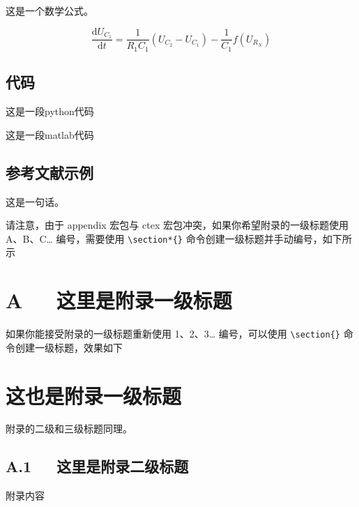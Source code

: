 \documentclass{MPEtemplate}
\begin{document}
这是一个数学公式。

\begin{equation}
    \frac{\mathrm{d} U_{C_1}}{\mathrm{d}  t}=\frac{1}{R_1 C_1} \left(U_{C_2}-U_{C_1}\right)-\frac{1}{C_1} f\left(U_{R_N}\right)
\end{equation}

\subsection{代码}

这是一段python代码



这是一段matlab代码



\subsection{参考文献示例}

这是一句话\cite{edwards1975theory}。

\printbibliography
\beginAppendix
请注意，由于 appendix 宏包与 ctex 宏包冲突，如果你希望附录的一级标题使用 A、B、C… 编号，需要使用 \lstinline|\section*{}| 命令创建一级标题并手动编号，如下所示

\section*{A~~~这里是附录一级标题}

如果你能接受附录的一级标题重新使用 1、2、3… 编号，可以使用 \lstinline|\section{}| 命令创建一级标题，效果如下

\section{这也是附录一级标题}

附录的二级和三级标题同理。

\subsection*{A.1~~~这里是附录二级标题}

附录内容
\end{document}
